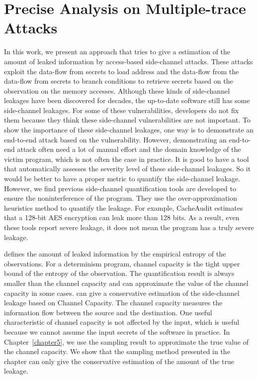 \section{Precise Analysis on Multiple-trace Attacks}
In this work, we present an approach that tries to give a 
estimation of the amount of leaked information by access-based
side-channel attacks. These attacks exploit the data-flow from secrets
to load address and the data-flow from the data-flow from secrets to
branch conditions to retrieve secrets based on the observation on the
memory accesses. Although these kinds of side-channel leakages have
been discovered for decades, the up-to-date software still has some
side-channel leakages. For some of these vulnerabilities, developers
do not fix them because they think these side-channel vulnerabilities
are not important. To show the importance of these side-channel
leakages, one way is to demonstrate an end-to-end attack based on the
vulnerability. However, demonstrating an end-to-end attack often need
a lot of manual effort and the domain knowledge of the victim program,
which is not often the case in practice. It is good to have a tool
that automatically assesses the severity level of these side-channel
leakages. So it would be better to have a proper metric to quantify
the side-channel leakage. However, we find previous side-channel
quantification tools are developed to ensure the noninterference of
the program. They use the over-approximation heuristics method to
quantify the leakage. For example, CacheAudit estimates that a 128-bit
AES encryption can leak more than 128 bits. As a result, even these
tools report severe leakage, it does not mean the program has a truly
severe leakage.

\ctool{} defines the amount of leaked information by the empirical entropy of the
observations. For a determinism program, channel capacity is the tight upper bound of the entropy of the observation. The quantification result is always smaller than the channel capacity and can approximate the value of the channel capacity in some cases. \ctool{} can give a conservative estimation of the
side-channel leakage based on Channel Capacity. The channel capacity
measures the information flow between the source and the
destination. One useful characteristic of channel capacity is not
affected by the input, which is useful because we cannot
assume the input secrets of the software in practice. In Chapter~\ref{chapter5}, we use the sampling result to approximate the true value of the
channel capacity. We show that the sampling method presented in the chapter can only give the conservative estimation of the amount of the true leakage.

